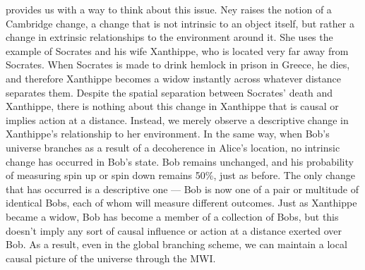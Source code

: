 \cite{NeyForthcoming} provides us with a way to think about this issue. Ney 
raises the notion of a Cambridge change, a change that is not intrinsic to an
object itself, but rather a change in extrinsic relationships to the environment
around it. She uses the example of Socrates and his wife Xanthippe, who is
located very far away from Socrates. When Socrates is made to drink hemlock in
prison in Greece, he dies, and therefore Xanthippe becomes a widow instantly
across whatever distance separates them. Despite the spatial separation between
Socrates' death and Xanthippe, there is nothing about this change in  Xanthippe
that is causal or implies action at a distance. Instead, we merely observe a 
descriptive change in Xanthippe's relationship to her environment. In the same
way, when Bob's universe branches as a result of a decoherence in Alice's 
location, no intrinsic change has occurred in Bob's state. Bob remains unchanged,
and his probability of measuring spin up or spin down remains 50\%, just as
before. The only change that has occurred is a descriptive one — Bob is now one
of a pair or multitude of identical Bobs, each of whom will measure different
outcomes. Just as Xanthippe became a widow, Bob has become a member of a
collection of Bobs, but this doesn't imply any sort of causal influence or
action at a distance exerted over Bob. As a result, even in the global branching
scheme, we can maintain a local causal picture of the universe through the MWI.
